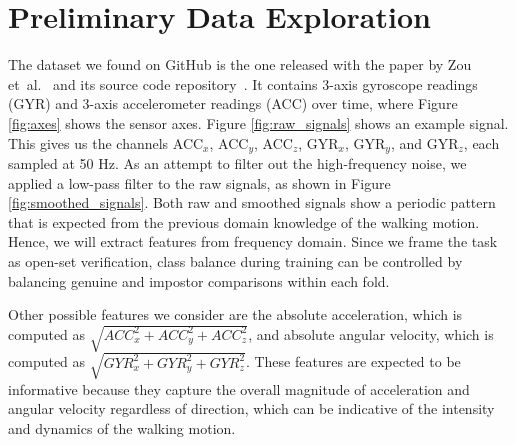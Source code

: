     \section{Preliminary Data Exploration}

The dataset we found on GitHub is the one released with the paper by Zou et~al.~\cite{zou2020gaitsmartphones} and its source code repository~\cite{zou2020gaitsmartphonesrepo}. It contains 3-axis gyroscope readings (GYR) and 3-axis accelerometer readings (ACC) over time, where Figure \ref{fig:axes} shows the sensor axes. Figure \ref{fig:raw_signals} shows an example signal. This gives us the channels ACC$_x$, ACC$_y$, ACC$_z$, GYR$_x$, GYR$_y$, and GYR$_z$, each sampled at 50 Hz. As an attempt to filter out the high-frequency noise, we applied a low-pass filter to the raw signals, as shown in Figure \ref{fig:smoothed_signals}. Both raw and smoothed signals show a periodic pattern that is expected from the previous domain knowledge of the walking motion. Hence, we will extract features from frequency domain. Since we frame the task as open-set verification, class balance during training can be controlled by balancing genuine and impostor comparisons within each fold.

Other possible features we consider are the absolute acceleration, which is computed as $\sqrt{ACC_x^2 + ACC_y^2 + ACC_z^2}$, and absolute angular velocity, which is computed as $\sqrt{GYR_x^2 + GYR_y^2 + GYR_z^2}$. These features are expected to be informative because they capture the overall magnitude of acceleration and angular velocity regardless of direction, which can be indicative of the intensity and dynamics of the walking motion. 

